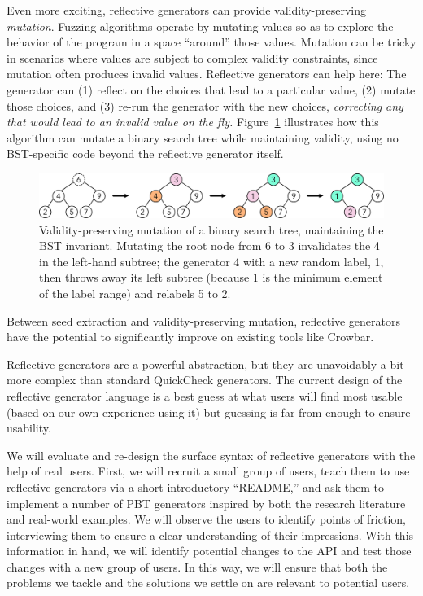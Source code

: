 Even more exciting,
reflective generators can provide
validity-preserving {\em mutation}.
Fuzzing algorithms operate by
mutating values
so as to explore
the behavior of the program in a space ``around'' those
values. Mutation can be
tricky in scenarios where values are subject to complex validity
constraints, since mutation often produces invalid values. Reflective
generators can help here: The generator can (1) reflect on the choices that lead
to a particular
value, (2) mutate those choices, and (3) re-run the generator with the new
choices, {\em correcting any that
would lead to an invalid value on the fly.} Figure~\ref{fig:mutation}
illustrates how this
algorithm can mutate a binary search tree while maintaining validity,
using no BST-specific code beyond the reflective generator itself.
\begin{figure}[t]
  \centering
  \includegraphics[width=.6\textwidth]{assets/mutate-diagram.pdf}
  \vspace{-2mm}
  \caption{Validity-preserving mutation of a binary search tree, maintaining the
  BST invariant. Mutating the root node from 6 to 3 invalidates the
  4 in the left-hand subtree; the generator 4 with a new random label,
1, then throws away its left subtree (because 1 is the
minimum element of the label range) and relabels 5 to 2.}\label{fig:mutation}
\end{figure}

Between seed extraction and validity-preserving mutation, reflective generators
have the potential to significantly improve on existing tools like Crowbar.

Reflective generators are a powerful abstraction, but they are unavoidably a bit
more complex than standard QuickCheck generators. The current design of the
reflective generator language is a best guess at what users will find most
usable (based on our own experience using it) but guessing is far from enough to
ensure usability.

We will evaluate and re-design the surface syntax of reflective generators with
the help of real users.  First, we will recruit a small group of users, teach
them to use reflective generators via a short introductory ``README,'' and ask
them to implement a number of PBT generators inspired by both the research
literature and real-world examples. We will observe the users to identify points
of friction, interviewing them to ensure a clear understanding of their
impressions. With this information in hand, we will identify potential changes
to the API and test those changes with a new group of users. In this way, we
will ensure that both the problems we tackle and the solutions we settle on are
relevant to potential users.

